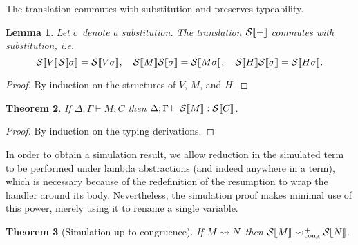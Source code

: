 \documentclass[12pt,phd,lfcs,twoside,openright,logo,leftchapter,normalheadings]{infthesis}
\theoremstyle{plain}
\newtheorem{theorem}{Theorem}[chapter]
\newtheorem{lemma}[theorem]{Lemma}
\theoremstyle{definition}
\begin{document}
The translation commutes with substitution and preserves typeability.
%
\begin{lemma}\label{lem:dstrans-subst}
  Let $\sigma$ denote a substitution. The translation $\mathcal{S}\llbracket - \rrbracket$
  commutes with substitution, i.e.
  \[
    \mathcal{S}\llbracket V \rrbracket\mathcal{S}\llbracket \sigma \rrbracket = \mathcal{S}\llbracket V\sigma \rrbracket,\quad
    \mathcal{S}\llbracket M \rrbracket\mathcal{S}\llbracket \sigma \rrbracket = \mathcal{S}\llbracket M\sigma \rrbracket,\quad
    \mathcal{S}\llbracket H \rrbracket\mathcal{S}\llbracket \sigma \rrbracket = \mathcal{S}\llbracket H\sigma \rrbracket.
  \]
\end{lemma}
%
\begin{proof}
  By induction on the structures of $V$, $M$, and $H$.
\end{proof}

\begin{theorem}
If $\Delta; \Gamma \vdash M : C$ then $\Delta; \Gamma \vdash
\mathcal{S}\llbracket M \rrbracket : \mathcal{S}\llbracket C \rrbracket$.
\end{theorem}
%
\begin{proof}
  By induction on the typing derivations.
\end{proof}

In order to obtain a simulation result, we allow reduction in the
simulated term to be performed under lambda abstractions (and indeed
anywhere in a term), which is necessary because of the redefinition of
the resumption to wrap the handler around its body.
%
Nevertheless, the simulation proof makes minimal use of this power,
merely using it to rename a single variable.
%

\begin{theorem}[Simulation up to congruence]
If $M \leadsto N$ then $\mathcal{S}\llbracket M \rrbracket \leadsto_{\mathrm{cong}}^+
\mathcal{S}\llbracket N \rrbracket$.
\end{theorem}
\end{document}
